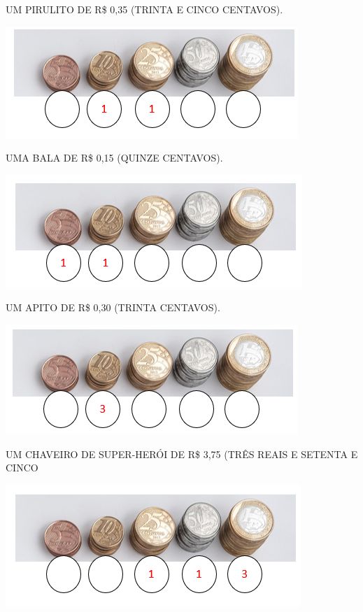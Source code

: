 \begin{escolha}
\item UM PIRULITO DE R\$ 0,35 (TRINTA E CINCO CENTAVOS).

\includegraphics[width=.7\textwidth]{media/image71.png}

\item UMA BALA DE R\$ 0,15 (QUINZE CENTAVOS).

\includegraphics[width=.7\textwidth]{media/image72.png}

\item UM APITO DE R\$ 0,30 (TRINTA CENTAVOS).

\includegraphics[width=.7\textwidth]{media/image73.png}

\item UM CHAVEIRO DE SUPER-HERÓI DE R\$ 3,75 (TRÊS REAIS E SETENTA E CINCO

\includegraphics[width=.7\textwidth]{media/image74.png}
\end{escolha}

